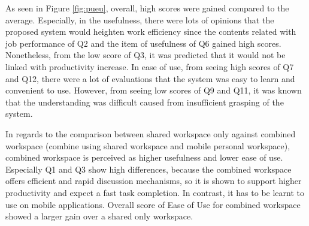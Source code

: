 As seen in Figure \ref{fig:pueu}, overall, high scores were gained compared to the average. Especially, in the usefulness, there were lots of opinions that the proposed system would heighten work efficiency since the contents related with job performance of Q2 and the item of usefulness of Q6 gained high scores. Nonetheless, from the low score of Q3, it was predicted that it would not be linked with productivity increase. In ease of use, from seeing high scores of Q7 and Q12, there were a lot of evaluations that the system was easy to learn and convenient to use. However, from seeing low scores of Q9 and Q11, it was known that the understanding was difficult caused from insufficient grasping of the system.

In regards to the comparison between shared workspace only against combined workspace (combine using shared workspace and mobile personal workspace), combined workspace is perceived as higher usefulness and lower ease of use. Especially Q1 and Q3 show high differences, because the combined workspace offers efficient and rapid discussion mechanisms, so it is shown to support higher productivity and expect a fast task completion. In contrast, it has to be learnt to use on mobile applications. Overall score of Ease of Use for combined workspace showed a larger gain over a shared only workspace.



